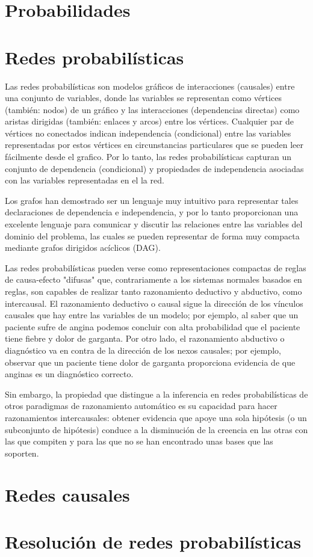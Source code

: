 \section{Probabilidades} 

\section{Redes probabilísticas}
Las redes probabilísticas son modelos gráficos de interacciones (causales) entre una
conjunto de variables, donde las variables se representan como vértices (también: nodos)
de un gráfico y las interacciones (dependencias directas) como aristas dirigidas (también:
enlaces y arcos) entre los vértices. Cualquier par de vértices no conectados indican 
independencia (condicional) entre las variables representadas
por estos vértices en circunstancias particulares que se pueden leer fácilmente desde el
grafico. Por lo tanto, las redes probabilísticas capturan un conjunto de dependencia (condicional)
y propiedades de independencia asociadas con las variables representadas en el
la red.

Los grafos han demostrado ser un lenguaje muy intuitivo para representar
tales declaraciones de dependencia e independencia, y por lo tanto proporcionan una excelente
lenguaje para comunicar y discutir las relaciones entre las 
variables del dominio del problema, las cuales se pueden representar de forma muy compacta 
mediante grafos dirigidos acíclicos (DAG).

Las redes probabilísticas pueden verse como representaciones compactas de reglas de causa-efecto "difusas" 
que, contrariamente a los sistemas normales basados en reglas, son capables de realizar tanto razonamiento 
deductivo y abductivo, como intercausal. El razonamiento deductivo o causal
sigue la dirección de los vínculos causales que hay entre las variables de un modelo; por ejemplo, al saber
que un paciente sufre de angina podemos concluir con alta probabilidad que
el paciente tiene fiebre y dolor de garganta. Por otro lado, el razonamiento abductivo o diagnóstico 
va en contra de la dirección de los nexos causales; por ejemplo, observar
que un paciente tiene dolor de garganta proporciona evidencia de que anginas es un diagnóstico correcto.

Sin embargo, la propiedad que distingue a la inferencia en redes probabilísticas
de otros paradigmas de razonamiento automático es su capacidad para hacer razonamientos intercausales: 
obtener evidencia que apoye una sola hipótesis (o un subconjunto de
hipótesis) conduce a la disminución de la creencia en las otras con las que compiten y para las que no se 
han encontrado unas bases que las soporten. 

\section{Redes causales}

\section{Resolución de redes probabilísticas}

